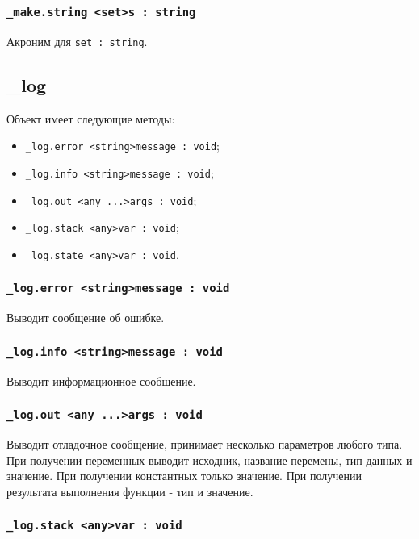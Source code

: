 \documentclass[a4paper, 14pt]{extarticle}
\newenvironment{icItems}
	{ \begin{itemize} [noitemsep,nolistsep] }
	{ \end{itemize} }
\begin{document}
\subsubsection{\lstinline|_make.string <set>s : string|}

Акроним для \lstinline|set : string|.

\subsection{{\color{orange} \_log}}

Объект \logtype{} имеет следующие методы:
\begin{icItems}
	\item \lstinline|_log.error <string>message : void|;
	\item \lstinline|_log.info <string>message : void|;
	\item \lstinline|_log.out <any ...>args : void|;
	\item \lstinline|_log.stack <any>var : void|;
	\item \lstinline|_log.state <any>var : void|.
\end{icItems}

\subsubsection{\lstinline|_log.error <string>message : void|}

Выводит сообщение об ошибке.

\subsubsection{\lstinline|_log.info <string>message : void|}

Выводит информационное сообщение.

\subsubsection{\lstinline|_log.out <any ...>args : void|}

Выводит отладочное сообщение, принимает несколько параметров любого типа. При получении переменных выводит исходник, название перемены, тип данных и значение. При получении константных только значение. При получении результата выполнения функции - тип и значение. 

\subsubsection{\lstinline|_log.stack <any>var : void|}
\end{document}
